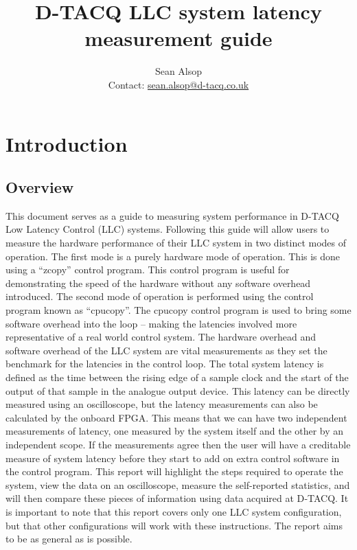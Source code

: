 \documentclass{article}
\begin{document}
\title{D-TACQ LLC system latency measurement guide}
\author{Sean Alsop \\ Contact: \href{mailto:sean.alsop@d-tacq.co.uk}{sean.alsop@d-tacq.co.uk} }

\maketitle

\tableofcontents

\section{Introduction} \label{intro}

\subsection{Overview}
This document serves as a guide to measuring system performance in \mbox{D-TACQ} Low Latency Control (LLC) systems.
Following this guide will allow users to  measure the hardware performance of their LLC system in two distinct modes of operation.
The first mode is a purely hardware mode of operation. This is done using a “zcopy” control program.
This control program is useful for demonstrating the speed of the hardware without any software overhead introduced.
The second mode of operation is performed using the control program known as “cpucopy”.
The cpucopy control program is used to bring some software overhead into the loop – making the latencies involved more representative of a real world control system.
The hardware overhead and software overhead of the LLC system are vital measurements as they set the benchmark for the latencies in the control loop.
\newline
The total system latency is defined as the time between the rising edge of a sample clock and the start of the output of that sample in the analogue output device.
This latency can be directly measured using an oscilloscope, but the latency measurements can also be calculated by the onboard FPGA.
This means that we can have two independent measurements of latency, one measured by the system itself and the other by an independent scope.
If the measurements agree then the user will have a creditable measure of system latency before they start to add on extra control software in the control program.
This report will highlight the steps required to operate the system, view the data on an oscilloscope, measure the self-reported statistics, and will then compare these pieces of information using data acquired at D‑TACQ.
\newline
It is important to note that this report covers only one LLC system configuration, but that other configurations will work with these instructions. The report aims to be as general as is possible. 
\end{document}
